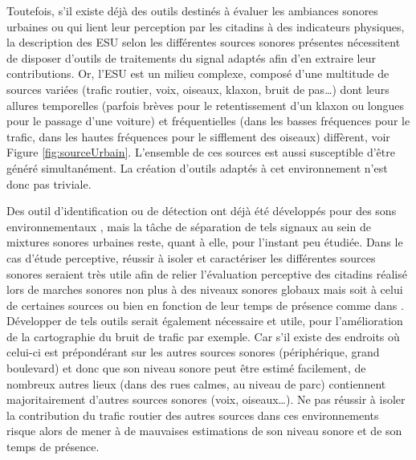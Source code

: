 Toutefois, s'il existe déjà des outils destinés à évaluer les ambiances sonores urbaines ou qui lient leur perception par les citadins à des indicateurs physiques, la description des ESU selon les différentes sources sonores présentes nécessitent de disposer d'outils de traitements du signal adaptés afin d'en extraire leur contributions. 
Or, l'ESU est un milieu complexe, composé d'une multitude de sources variées (trafic routier, voix, oiseaux, klaxon, bruit de pas\dots) dont leurs allures temporelles (parfois brèves pour le retentissement d'un klaxon ou longues pour le passage d'une voiture) et fréquentielles (dans les basses fréquences pour le trafic, dans les hautes fréquences pour le sifflement des oiseaux) diffèrent, voir Figure \ref{fig:sourceUrbain}.
L'ensemble de ces sources est aussi susceptible d'être généré simultanément. La création d'outils adaptés à cet environnement n'est donc pas triviale.

Des outil d'identification ou de détection ont déjà été  développés pour des sons environnementaux \cite{mesaros_sound_2015, chachada2014environmental, cakir2015polyphonic}, mais la tâche de séparation de tels signaux au sein de mixtures sonores urbaines reste, quant à elle, pour l'instant peu étudiée. 
Dans le cas d'étude perceptive, réussir à isoler et caractériser les différentes sources sonores seraient très utile afin de relier l'évaluation perceptive des citadins réalisé lors de marches sonores non plus à des niveaux sonores globaux mais soit à celui de certaines sources ou bien en fonction de leur temps de présence comme dans \cite{aumond2017modeling}.
Développer de tels outils serait également nécessaire et utile, pour l'amélioration de la cartographie du bruit de trafic par exemple. Car s'il existe des endroits où celui-ci est prépondérant sur les autres sources sonores (périphérique, grand boulevard) et donc que son niveau sonore peut être estimé facilement, de nombreux autres lieux (dans des rues calmes, au niveau de parc) contiennent majoritairement d'autres sources sonores (voix, oiseaux\dots). Ne pas réussir à isoler la contribution du trafic routier des autres sources dans ces environnements risque alors de mener à de mauvaises estimations de son niveau sonore et de son temps de présence. \\

